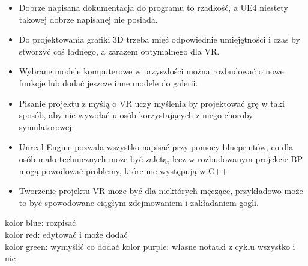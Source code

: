 \documentclass[a4paper,12pt,reqno]{article}
\begin{document}
\begin{itemize}
\item Dobrze napisana dokumentacja do programu to rzadkość, a UE4 niestety takowej dobrze napisanej nie posiada.
\item Do projektowania grafiki 3D trzeba mięć odpowiednie umiejętności i czas by stworzyć coś ładnego, a zarazem optymalnego dla VR.
\item Wybrane modele komputerowe w przyszłości można rozbudować o nowe funkcje lub dodać jeszcze inne modele do galerii.
\item Pisanie projektu z myślą o VR uczy myślenia by projektować grę w taki sposób, aby nie wywołać u osób korzystających z niego choroby symulatorowej.
\item Unreal Engine pozwala wszystko napisać przy pomocy blueprintów, co dla osób mało technicznych może być zaletą, lecz w rozbudowanym projekcie BP mogą powodować problemy, które nie występują w C++
\item Tworzenie projektu VR może być dla niektórych męczące, przykładowo może to być spowodowane ciągłym zdejmowaniem i zakładaniem gogli.
\end{itemize}

\newpage




{\color{blue} kolor blue: rozpisać}\\
{\color{red} kolor red: edytować i może dodać}\\
{\color{green} kolor green: wymyślić co dodać}
{\color{purple} kolor purple: własne notatki z cyklu wszystko i nic}
\end{document}
